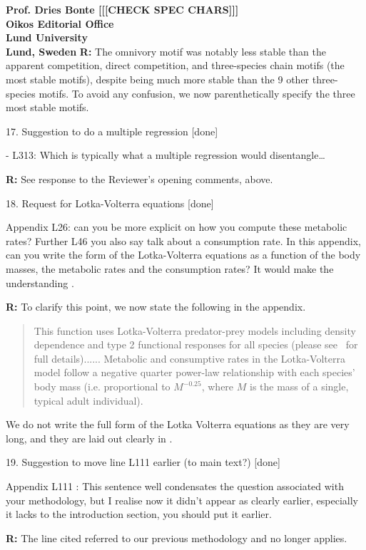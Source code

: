 \documentclass[12pt]{letter}
\begin{document}
\begin{letter}{\bf Prof. Dries Bonte [[[CHECK SPEC CHARS]]]\\
Oikos Editorial Office \\
Lund University \\
Lund, Sweden}
        \textbf{R:} The omnivory motif was notably less stable than the apparent competition, direct competition, and three-species chain motifs (the most stable motifs), despite being much more stable than the 9 other three-species motifs. To avoid any confusion, we now parenthetically specify the three most stable motifs.


    17. Suggestion to do a multiple regression [done]

      - L313: Which is typically what a multiple regression would disentangle…

      \textbf{R:} See response to the Reviewer's opening comments, above.


    18. Request for Lotka-Volterra equations [done]

      Appendix L26: can you be more explicit on how you compute these metabolic rates? Further L46 you also say talk about a consumption rate. In this appendix, can you write the form of the Lotka-Volterra equations as a function of the body masses, the metabolic rates and the consumption rates? It would make the understanding .

      \textbf{R:}
      To clarify this point, we now state the following in the appendix.
      
      \begin{quotation}
      This function uses Lotka-Volterra predator-prey models including density dependence and type 2 functional responses for all species (please see~\citet{Delmas2017} for full details)...... Metabolic and consumptive rates in the Lotka-Volterra model follow a negative quarter power-law relationship with each species' body mass (i.e. proportional to $M^{-0.25}$, where $M$ is the mass of a single, typical adult individual). 
      \end{quotation}
      
      We do not write the full form of the Lotka Volterra equations as they are very long, and they are laid out clearly in \citep{Delmas2017}.
      

    19. Suggestion to move line L111 earlier (to main text?) [done]

      Appendix L111 : This sentence well condensates the question associated with your methodology, but I realise now it didn’t appear as clearly earlier, especially it lacks to the introduction section, you should put it earlier.


      \textbf{R:} The line cited referred to our previous methodology and no longer applies.



\end{letter}
\end{document}
